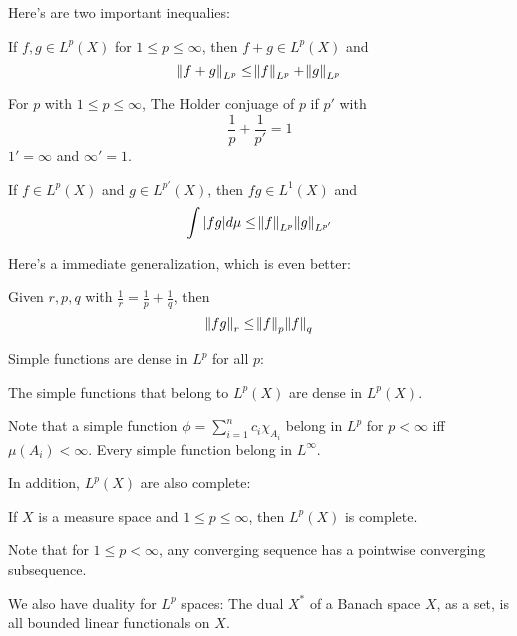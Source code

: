 \documentclass[main.tex]{subfiles}
\begin{document}
Here's are two important inequalies:

\begin{theorem}
If $f, g \in L^p(X)$ for $1 \leq p \leq \infty$, then $f + g \in L^p(X)$ and 
$$
\norm{f + g}_{L^p} \leq \norm{f}_{L^p} + \norm{g}_{L^p}
$$
\end{theorem}

\begin{definition}
For $p$ with $1 \leq p \leq \infty$, 
The Holder conjuage of $p$ if $p'$ with 
$$
\frac{1}{p} + \frac{1}{p'} = 1
$$
$1' = \infty$ and $\infty' = 1$.
\end{definition}

\begin{theorem}
If $f \in L^p(X)$ and $g \in L^{p'}(X)$, then $fg \in L^1(X)$ and 
$$
\int |fg| d\mu \leq \norm{f}_{L^p}\norm{g}_{L^{p'}}
$$
\end{theorem}

Here's a immediate generalization, which is even better:

\begin{theorem}
Given $r, p, q$ with $\frac{1}{r} = \frac{1}{p} + \frac{1}{q}$, then 
$$
\norm{fg}_r \leq \norm{f}_{p}  \norm{f}_q 
$$

\end{theorem}

Simple functions are dense in $L^p$ for all $p$:

\begin{theorem}
The simple functions that belong to $L^p(X)$ are dense in $L^p(X)$.
\end{theorem}

Note that a simple function $\phi = \sum_{i=1} ^n c_i \chi_{A_i}$ belong in $L^p$ for $p < \infty$ iff $\mu(A_i) < \infty$. Every simple function belong in $L^\infty$.

In addition, $L^p(X)$ are also complete:

\begin{theorem}
If $X$ is a measure space and $1 \leq p \leq \infty$, then $L^p(X)$ is complete.
\end{theorem}

Note that for $1 \leq p < \infty$, any converging sequence has a pointwise converging subsequence.

We also have duality for $L^p$ spaces:
The dual $X^*$ of a Banach space $X$, as a set, is all bounded linear functionals on $X$.
\end{document}
